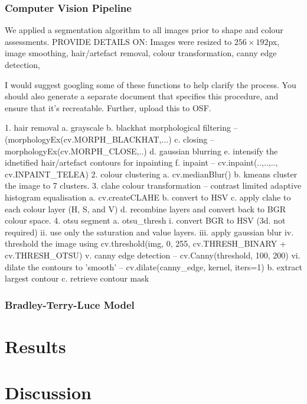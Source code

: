 \documentclass[a4paper, natbib, doc, 12pt]{apa7}
\begin{document}
\subsubsection{Computer Vision Pipeline}%
We applied a segmentation algorithm to all images prior to shape and colour assessments. PROVIDE DETAILS ON: Images were resized to $256\times192$px, image smoothing, hair/artefact removal, colour transformation, canny edge detection, 

I would suggest googling some of these functions to help clarify the process. You should also generate a separate document that specifies this procedure, and ensure that it's recreatable. Further, upload this to OSF.

1. hair removal
    a. grayscale
    b. blackhat morphological filtering -- (morphologyEx(cv.MORPH_BLACKHAT,...)
    c. closing -- morphologyEx(cv.MORPH_CLOSE,..)
    d. gaussian blurring
    e. intensify the idnetified hair/artefact contours for inpainting
    f. inpaint -- cv.inpaint(..,..,.., cv.INPAINT_TELEA)
2. colour clustering
    a. cv.medianBlur()
    b. kmeans cluster the image to 7 clusters.
3. clahe colour transformation -- contrast limited adaptive histogram equalisation
    a.  cv.createCLAHE
    b. convert to HSV
    c. apply clahe to each colour layer (H, S, and V)
    d. recombine layers and convert back to BGR colour space.
4. otsu segment
    a. otsu_thresh
        i. convert BGR to HSV (3d. not required)
        ii. use only the saturation and value layers.
        iii. apply gaussian blur
        iv. threshold the image using cv.threshold(img, 0, 255, cv.THRESH_BINARY + cv.THRESH_OTSU)
        v. canny edge detection -- cv.Canny(threshold, 100, 200)
        vi. dilate the contours to 'smooth' -- cv.dilate(canny_edge, kernel, iters=1)
    b. extract largest contour
    c. retrieve contour mask

\subsubsection{Bradley-Terry-Luce Model}%
\label{ssub:Bradley-Terry-Luce Model}


\section{Results}


\section{Discussion}
\end{document}
